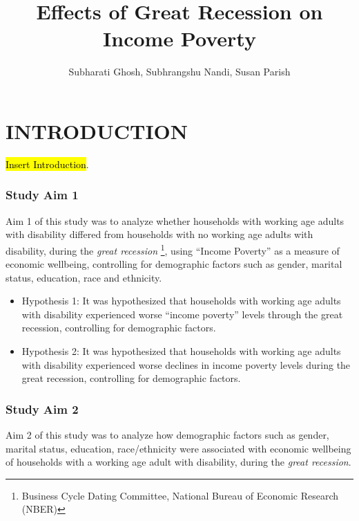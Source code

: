 \documentclass[11pt]{extarticle} %
\begin{document}
\doublespacing


\title{Effects of Great Recession on Income Poverty}
\author{Subharati Ghosh, Subhrangshu Nandi, Susan Parish \\
\date{}
}

\maketitle
\section*{INTRODUCTION}
\noindent
{\hl{Insert Introduction}}.

\subsubsection*{Study Aim 1}
Aim 1 of this study was to analyze whether households with working age adults with disability differed from households with no working age adults with disability, during the {\emph{great recession}} \footnote{Business Cycle Dating Committee, National Bureau of Economic Research (NBER)}, using ``Income Poverty'' as a measure of economic wellbeing, controlling for demographic factors such as gender, marital status, education, race and ethnicity. 
\begin{itemize}
\item Hypothesis 1: It was hypothesized that households with working age adults with disability experienced worse ``income poverty'' levels through the great recession, controlling for demographic factors.
\item Hypothesis 2: It was hypothesized that households with working age adults with disability experienced worse declines in income poverty levels during the great recession, controlling for demographic factors.
\end{itemize}

\subsubsection*{Study Aim 2}
Aim 2 of this study was to analyze how demographic factors such as gender, marital status, education, race/ethnicity were associated with economic wellbeing of households with a working age adult with disability, during the {\emph{great recession}}. 
\end{document}
